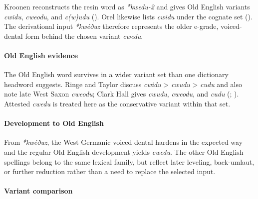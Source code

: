 \documentclass[
  british,
  a4paper,
]{article}
\begin{document}
Kroonen reconstructs the resin word as \emph{*kwedu-2} and gives Old
English variants \emph{cwidu}, \emph{cweodu}, and \emph{c(w)udu}
(). Orel likewise lists
\emph{cwidu} under the cognate set (). The derivational input \emph{*kwéðuz} therefore represents the
older e-grade, voiced-dental form behind the chosen variant
\emph{cwedu}.

\paragraph{Old English evidence}\label{old-english-evidence}

The Old English word survives in a wider variant set than one dictionary
headword suggests. Ringe and Taylor discuss \emph{cwidu} \textgreater{}
\emph{cwudu} \textgreater{} \emph{cudu} and also note late West Saxon
\emph{cweodu}; Clark Hall gives \emph{cwudu}, \emph{cweodu}, and
\emph{cudu} (;
). Attested
\emph{cwedu} is treated here as the conservative variant within that
set.

\paragraph{Development to Old English}\label{development-to-old-english}

From \emph{*kwéðuz}, the West Germanic voiced dental hardens in the
expected way and the regular Old English development yields
\emph{cwedu}. The other Old English spellings belong to the same lexical
family, but reflect later leveling, back-umlaut, or further reduction
rather than a need to replace the selected input.

\paragraph{Variant comparison}\label{variant-comparison}
\end{document}
